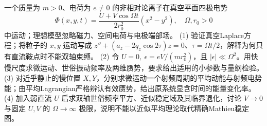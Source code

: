 一个质量为 \(m>0\)、电荷为 \(e\ne0\) 的非相对论离子在真空平面四极电势
\[
\Phi(x,y,t)=\frac{U+V\cos\Omega t}{2r_0^2}(x^2-y^2),\quad \Omega,r_0>0
\]
中运动；理想模型忽略磁力、空间电荷与电极端部场。
(1) 验证真空Laplace方程；将粒子的 \(x,y\) 运动写成 \(z''+(a_z-2q_z\cos2\tau)z=0\)、\(\tau=\Omega t/2\)，解释为何只有直流鞍点时不能双轴束缚。
(2) 令 \(U=0,\ \epsilon=eV/(mr_0^2)\)，且 \(|\epsilon|\ll\Omega^2\)。用快慢尺度求微运动、世俗振动频率及两维赝势，要求给出适用的小参数与量纲检验。
(3) 对近乎静止的慢位置 \(X,Y\)，分别求微运动一个射频周期的平均动能与射频电势能；由平均Lagrangian严格辨认有效赝势，给出原系统显含时间的能量变化率。
(4) 加入弱直流 \(U\) 后求双轴世俗频率平方、近似稳定域及其临界退化，讨论 \(V\to0\) 与固定 \(U,V\) 的 \(\Omega\to\infty\) 极限，说明不能以近似平均理论取代精确Mathieu稳定图。